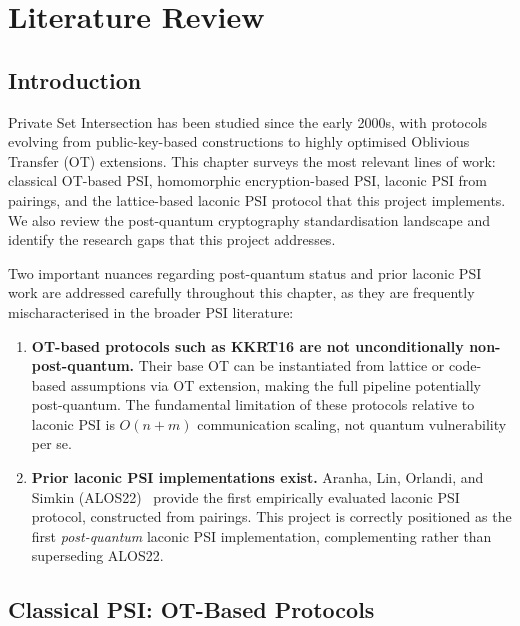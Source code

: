 \chapter{Literature Review}

\section{Introduction}

Private Set Intersection has been studied since the early 2000s, with protocols
evolving from public-key-based constructions to highly optimised Oblivious Transfer
(OT) extensions. This chapter surveys the most relevant lines of work: classical
OT-based PSI, homomorphic encryption-based PSI, laconic PSI from pairings, and
the lattice-based laconic PSI protocol that this project implements. We also review
the post-quantum cryptography standardisation landscape and identify the research
gaps that this project addresses.

Two important nuances regarding post-quantum status and prior laconic PSI work are
addressed carefully throughout this chapter, as they are frequently mischaracterised
in the broader PSI literature:

\begin{enumerate}
    \item \textbf{OT-based protocols such as KKRT16 are not unconditionally
          non-post-quantum.} Their base OT can be instantiated from lattice or
          code-based assumptions via OT extension, making the full pipeline
          potentially post-quantum. The fundamental limitation of these protocols
          relative to laconic PSI is $O(n + m)$ communication scaling, not
          quantum vulnerability per se.
    \item \textbf{Prior laconic PSI implementations exist.} Aranha, Lin, Orlandi,
          and Simkin (ALOS22)~\cite{alos2022} provide the first empirically evaluated
          laconic PSI protocol, constructed from pairings. This project is correctly
          positioned as the first \textit{post-quantum} laconic PSI implementation,
          complementing rather than superseding ALOS22.
\end{enumerate}

\section{Classical PSI: OT-Based Protocols}

